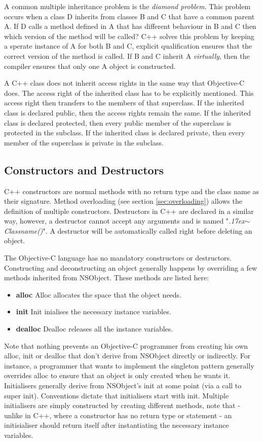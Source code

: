 \documentclass[11pt, a4paper, twocolumn]{article}
\newcommand{\mytilde}{\raise.17ex\hbox{$\scriptstyle\mathtt{\sim}$}}
\begin{document}
A common multiple inheritance problem is the \textit{diamond problem}. This problem occurs when a class D inherits from classes B and C that have a common parent A. If D calls a method defined in A that has different behaviour in B and C then which version of the method will be called? C++ solves this problem by keeping a sperate instance of A for both B and C, explicit qualification ensures that the correct version of the method is called. If B and C inherit A \textit{virtually}, then the compiler ensures that only one A object is constructed.

A C++ class does not inherit access rights in the same way that Objective-C does. The access right of the inherited class has to be explicitly mentioned. This access right then transfers to the members of that superclass. If the inherited class is declared public, then the access rights remain the same. If the inherited class is declared protected, then every public member of the superclass is protected in the subclass. If the inherited class is declared private, then every member of the superclass is private in the subclass.

\subsection{Constructors and Destructors}
\label{sec:constructor}
C++ constructors are normal methods with no return type and the class name as their signature. Method overloading (see section \ref{sec:overloading}) allows the definition of multiple constructors. Destructors in C++ are declared in a similar way, however, a destructor cannot accept any arguments and is named "\textit{\mytilde{}Classname()}". A destructor will be automatically called right before deleting an object.

The Objective-C language has no mandatory constructors or destructors. Constructing and deconstructing an object generally happens by overriding a few methods inherited from NSObject. These methods are listed here: 
\begin{itemize}
\item \textbf {alloc} Alloc allocates the space that the object needs.
\item \textbf {init} Init inialises the necessary instance variables.
\item \textbf {dealloc} Dealloc releases all the instance variables.
\end{itemize}

Note that nothing prevents an Objective-C programmer from creating his own alloc, init or dealloc that don't derive from NSObject directly or indirectly. For instance, a programmer that wants to implement the singleton pattern generally overrides alloc to ensure that an object is only created when he wants it.
Initialisers generally derive from NSObject's init at some point (via a call to super init). Conventions dictate that initialisers start with init. Multiple initialisers are simply constructed by creating different methods, note that - unlike in C++, where a constructor has no return type or statement - an initisialiser should return itself after instantiating the necessary instance variables.
\end{document}
